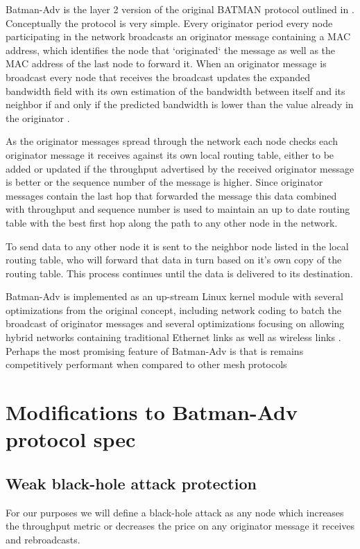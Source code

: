 \documentclass[11pt]{article}
\begin{document}
Batman-Adv is the layer 2 version of the original BATMAN protocol outlined in \cite{batman}. Conceptually the protocol is very simple. Every originator period every node participating in the network broadcasts an originator message containing a MAC address, which identifies the node that `originated` the message as well as the MAC address of the last node to forward it.  When an originator message is broadcast every node that receives the broadcast updates the expanded bandwidth field with its own estimation of the bandwidth between itself and its neighbor if and only if the predicted bandwidth is lower than the value already in the originator \cite{batroam}.

As the originator messages spread through the network each node checks each originator message it receives against its own local routing table, either to be added or updated if the throughput advertised by the received originator message is better or the sequence number of the message is higher. Since originator messages contain the last hop that forwarded the message this data combined with throughput and sequence number is used to maintain an up to date routing table with the best first hop along the path to any other node in the network.

To send data to any other node it is sent to the neighbor node listed in the local routing table, who will forward that data in turn based on it's own copy of the routing table. This process continues until the data is delivered to its destination.

Batman-Adv is implemented as an up-stream Linux kernel module with several optimizations from the original concept, including network coding to batch the broadcast of originator messages and several optimizations focusing on allowing hybrid networks containing traditional Ethernet links as well as wireless links \cite{catwoman}. Perhaps the most promising feature of Batman-Adv is that is remains competitively performant when compared to other mesh protocols \cite{meshperf}


\section{Modifications to Batman-Adv protocol spec}

\subsection{Weak black-hole attack protection} \label{blackhole}
For our purposes we will define a black-hole attack as any node which increases the throughput metric or decreases the price on any originator message it receives and rebroadcasts.
\end{document}
